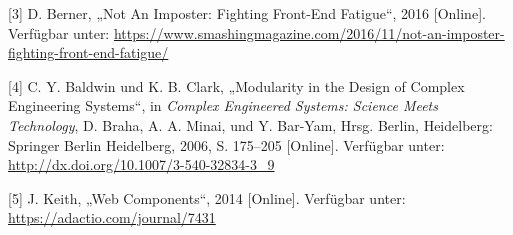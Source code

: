 \hypertarget{ref-Berner2016}{}
{[}3{]} D. Berner, „Not An Imposter: Fighting Front-End Fatigue``, 2016
{[}Online{]}. Verfügbar unter:
\url{https://www.smashingmagazine.com/2016/11/not-an-imposter-fighting-front-end-fatigue/}

\hypertarget{ref-Baldwin2006}{}
{[}4{]} C. Y. Baldwin und K. B. Clark, „Modularity in the Design of
Complex Engineering Systems``, in \emph{Complex Engineered Systems:
Science Meets Technology}, D. Braha, A. A. Minai, und Y. Bar-Yam, Hrsg.
Berlin, Heidelberg: Springer Berlin Heidelberg, 2006, S. 175--205
{[}Online{]}. Verfügbar unter:
\url{http://dx.doi.org/10.1007/3-540-32834-3_9}

\hypertarget{ref-Keith2014}{}
{[}5{]} J. Keith, „Web Components``, 2014 {[}Online{]}. Verfügbar unter:
\url{https://adactio.com/journal/7431}
